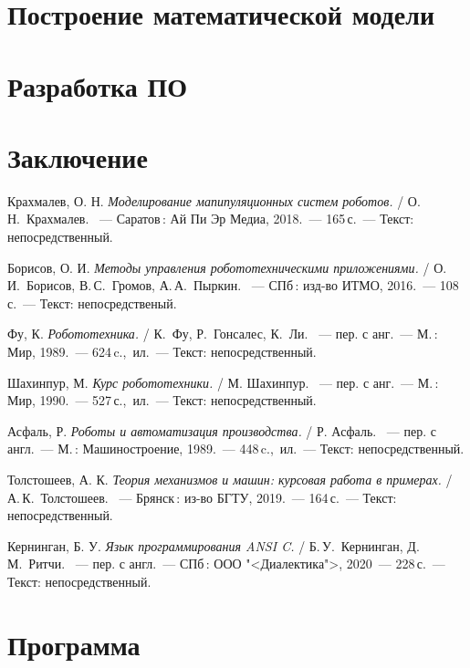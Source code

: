 \documentclass[oneside, final, 14pt]{extarticle}
\begin{document}
\newpage

\section{Построение математической модели}


\newpage

\section{Разработка ПО}


\newpage

\section*{Заключение}


\newpage

\begin{thebibliography}{00}

   Крахмалев, О. Н.
  \emph{Моделирование мапипуляционных систем роботов.}
  / О.\,Н.~Крахмалев.
  ~--- Саратов\,: Ай Пи Эр Медиа, 2018.~--- 165\,с.~--- Текст: непосредственный.

   Борисов, О. И.
  \emph{Методы управления робототехническими приложениями.}
  / О.\,И.~Борисов, В.\,С.~Громов, А.\,А.~Пыркин.
  ~--- СПб\,: изд-во ИТМО, 2016.~--- 108\,с.~--- Текст: непосредственый.

   Фу, К.
  \emph{Робототехника.}
  / К.~Фу, Р.~Гонсалес, К.~Ли.
  ~--- пер. с анг.~--- М.\,: Мир, 1989.~--- 624\,c.,~ил.~--- Текст: непосредственный.
  
   Шахинпур, М.
  \emph{Курс робототехники.}
  / М. Шахинпур.
  ~--- пер. с анг.~--- М.\,: Мир, 1990.~--- 527\,с.,~ил.~--- Текст: непосредственный.

   Асфаль, Р.
  \emph{Роботы и автоматизация производства.}
  / Р. Асфаль.
  ~--- пер. с англ.~--- М.\,: Машиностроение, 1989.~--- 448\,c.,~ил.~--- Текст: непосредственный.

   Толстошеев, А. К.
  \emph{Теория механизмов и машин: курсовая работа в примерах.}
  / А.\,К.~Толстошеев. 
  ~--- Брянск\,: из-во БГТУ, 2019.~--- 164\,с.~--- Текст: непосредственный.

   Кернинган, Б. У.
  \emph{Язык программирования ANSI C.}
  / Б.\,У.~Кернинган, Д.\,М.~Ритчи.
  ~--- пер. с англ.~--- СПб\,: ООО "<Диалектика">, 2020~--- 228\,с.~--- Текст: непосредственный.

\end{thebibliography}
\newpage

\appendix

\section{Программа}

\end{document}
